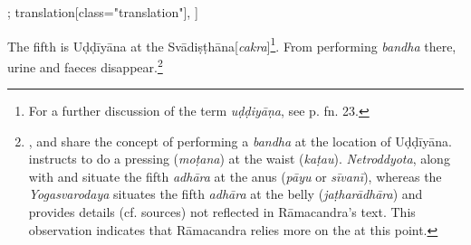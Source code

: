 \begin{alignment}[
  texts=edition[class="edition"];
  translation[class="translation"],
  ]
\begin{translation}
\begin{tlate}
      
      The fifth is Uḍḍīyāna at the Svādiṣṭhāna[\textit{cakra}]\footnote{For a further discussion of the term \textit{uḍḍiyāṇa}, see p.\pageref{cakra2} fn. 23.}. From performing \textit{bandha} there, urine and faeces disappear.\footnote{,  and  share the concept of performing a \textit{bandha} at the location of Uḍḍīyāna.  instructs to do a pressing (\textit{moṭana}) at the waist (\textit{kaṭau}). \textit{Netroddyota}, along with  and  situate the fifth \textit{adhāra} at the anus (\textit{pāyu} or \textit{sīvanī}), whereas the \textit{Yogasvarodaya} situates the fifth \textit{adhāra} at the belly (\textit{jaṭharādhāra}) and provides details (cf. sources) not reflected in Rāmacandra's text. This observation indicates that Rāmacandra relies more on the  at this point.}
\clearpage 
    \end{tlate}
  \end{translation}
\end{alignment}
\pagebreak %
